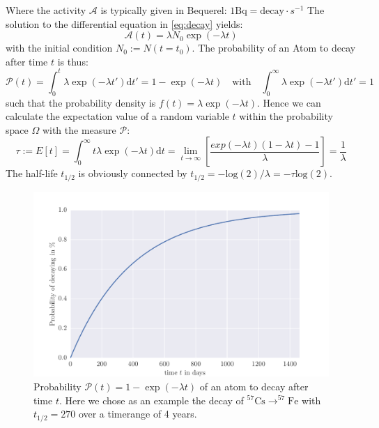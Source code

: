 Where the activity $\mathcal{A}$ is typically given in Bequerel: $1 \textrm{Bq}= \textrm{decay}\cdot s^{-1}$ 
The solution to the differential equation in \eqref{eq:decay} yields:
\begin{equation}
    \mathcal{A}(t) = \lambda N_0 \exp(-\lambda t)
\end{equation}
with the initial condition $N_0 := N(t=t_0)$. 
The probability of an Atom to decay after time $t$ is thus:
\begin{equation}
    \mathcal{P}(t) = \int_{0}^{t}\lambda \exp(-\lambda t')\mathrm{d}t' = 1 -  \exp(-\lambda t)  \quad
    \textrm{with} \quad \int_{0}^{\infty}\lambda \exp(-\lambda t')\mathrm{d}t' = 1
\end{equation}
such that the probability density is $f(t) = \lambda \exp(-\lambda t)$.
Hence we can calculate the expectation value of a random variable $t$ within the probability space
$\Omega$ with the measure  $\mathcal{P}$:
\begin{equation}
    \tau := E[t] = \int_{0}^{\infty} t \lambda \exp(-\lambda t) \mathrm{d}t 
    =\lim_{t \rightarrow \infty}\left[ \frac{exp(-\lambda t) (1-\lambda t) - 1 }{\lambda} \right] 
= \frac{1}{\lambda}
\end{equation}
The half-life $t_{1/2}$ is obviously connected by $t_{1/2}= -\mathrm{log}(2)/ \lambda = - \tau \mathrm{log}(2)$.
\begin{figure}[htpb]
    \centering
    \includegraphics[width=0.9\linewidth]{analysis/figures/halflife}
    \caption{Probability $\mathcal{P}(t) = 1 -  \exp(-\lambda t)$ of an atom to decay after time $t$.
        Here we chose as an example the decay of
        $^{57}\textrm{Cs}\rightarrow ^{57}\textrm{Fe}$ with $t_{1/2}=270$ over a timerange
    of 4 years.}
    \label{fig:decay}
\end{figure}
\clearpage
